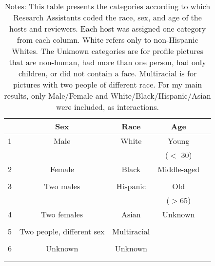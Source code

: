 {
\def\sym#1{\ifmmode^{#1}\else\(^{#1}\)\fi}
\begin{longtable}{l*{4}{c}}
\caption{Coding categories}\\
\hline\hline\endfirsthead\hline\endhead\hline\endfoot\endlastfoot
                    &\multicolumn{1}{c}{Sex}&\multicolumn{1}{c}{Race}&\multicolumn{1}{c}{Age}\\
\hline

1          &           Male         &           White         &           Young      \\ 
                    &                 &                  &          ($<$ 30)      \\
[1em]
2        &      Female  &      Black  &       Middle-aged     \\
                    &              &              &         \\
[1em]
3    &       Two males        &      Hispanic &       Old    \\
                    &              &              &     ($>$65)       \\
[1em]
4          &      Two females        &      Asian         &     Unknown      \\
                    &              &              &          \\
[1em]
5        &      Two people, different sex         &      Multiracial         &       \\
                    &              &              &       \\
[1em]
6    &       Unknown        &       Unknown  &        \\
                    &             &              &             \\
\hline\hline

\caption*{Notes: This table presents the categories according to which Research Assistants coded the race, sex, and age of the hosts and reviewers. Each host was assigned one category from each column. White refers only to non-Hispanic Whites. The Unknown categories are for profile pictures that are non-human, had more than one person, had only children, or did not contain a face. Multiracial is for pictures with two people of different race. For my main results, only Male/Female and White/Black/Hispanic/Asian were included, as interactions.}
\label{Table 1}


\end{longtable}
}
